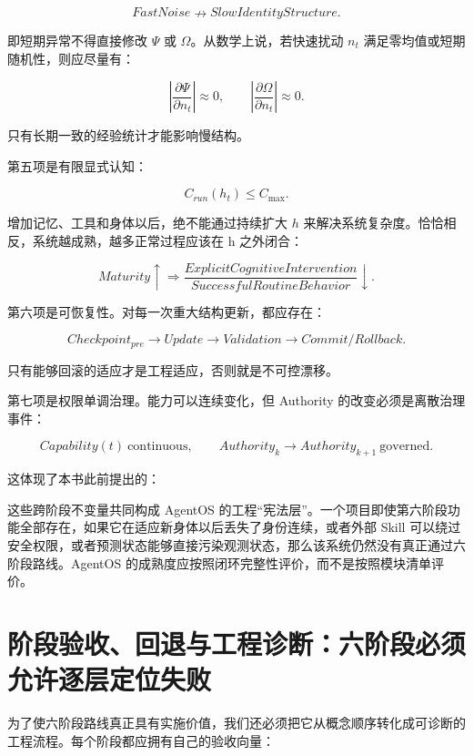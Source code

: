 \[
FastNoise
\nrightarrow
SlowIdentityStructure.
\]

即短期异常不得直接修改 \(\Psi\) 或 \(\Omega\)。从数学上说，若快速扰动 \(n_t\) 满足零均值或短期随机性，则应尽量有：

\[
\left|
\frac{\partial\Psi}{\partial n_t}
\right|
\approx0,
\qquad
\left|
\frac{\partial\Omega}{\partial n_t}
\right|
\approx0.
\]

只有长期一致的经验统计才能影响慢结构。

第五项是有限显式认知：

\[
C_{run}(h_t)\leq C_{\max}.
\]

增加记忆、工具和身体以后，绝不能通过持续扩大 \(h\) 来解决系统复杂度。恰恰相反，系统越成熟，越多正常过程应该在 h 之外闭合：

\[
Maturity\uparrow
\Rightarrow
\frac{
ExplicitCognitiveIntervention
}{
SuccessfulRoutineBehavior
}
\downarrow.
\]

第六项是可恢复性。对每一次重大结构更新，都应存在：

\[
Checkpoint_{pre}
\rightarrow
Update
\rightarrow
Validation
\rightarrow
Commit/Rollback.
\]

只有能够回滚的适应才是工程适应，否则就是不可控漂移。

第七项是权限单调治理。能力可以连续变化，但 Authority 的改变必须是离散治理事件：

\[
Capability(t)
\ \mathrm{continuous},
\qquad
Authority_k
\rightarrow
Authority_{k+1}
\ \mathrm{governed}.
\]

这体现了本书此前提出的：

\begin{statementbox}
\centering
{}
\end{statementbox}

这些跨阶段不变量共同构成 AgentOS 的工程“宪法层”。一个项目即使第六阶段功能全部存在，如果它在适应新身体以后丢失了身份连续，或者外部 Skill 可以绕过安全权限，或者预测状态能够直接污染观测状态，那么该系统仍然没有真正通过六阶段路线。AgentOS 的成熟度应按照闭环完整性评价，而不是按照模块清单评价。

\section{阶段验收、回退与工程诊断：六阶段必须允许逐层定位失败}

为了使六阶段路线真正具有实施价值，我们还必须把它从概念顺序转化成可诊断的工程流程。每个阶段都应拥有自己的验收向量：

